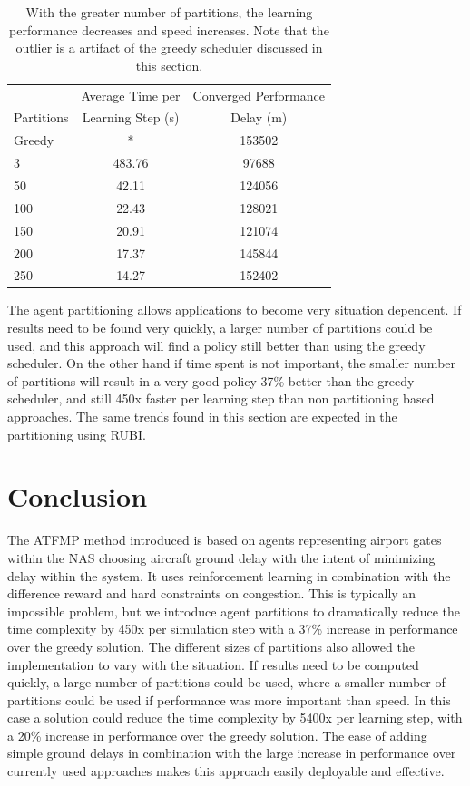 \documentclass{aamas2014}
\begin{document}
\begin{table}
\begin{tabular}{|l|c|c|}
\hline
& Average Time per &Converged Performance\\
Partitions & Learning Step (s) &Delay (m)\\
\hline
Greedy & * & 153502 \\
\hline
3 & 483.76 & 97688 \\
\hline
50 & 42.11 & 124056 \\
\hline
100 & 22.43 & 128021 \\
\hline
150 & 20.91 & 121074 \\
\hline
200 & 17.37 & 145844\\
\hline
250 & 14.27 & 152402 \\
\hline
\end{tabular}
\caption{With the greater number of partitions, the learning performance decreases and speed increases. Note that the outlier is a artifact of the greedy scheduler discussed in this section.}
\label{ATFMPOldTable}
\end{table}

The agent partitioning allows applications to become very situation dependent. If results need to be found very quickly, a larger number of partitions could be used, and this approach will find a policy still better than using the greedy scheduler. On the other hand if time spent is not important, the smaller number of partitions will result in a very good policy 37\% better than the greedy scheduler, and still 450x faster per learning step than non partitioning based approaches. The same trends found in this section are expected in the partitioning using RUBI.


\section{Conclusion}

The ATFMP method introduced is based on agents representing airport gates within the NAS choosing aircraft ground delay with the intent of minimizing delay within the system. It uses reinforcement learning in combination with the difference reward and hard constraints on congestion. This is typically an impossible problem, but we introduce agent partitions to dramatically reduce the time complexity by  450x per simulation step with a 37\% increase in performance over the greedy solution. The different sizes of partitions also allowed the implementation to vary with the situation. If results need to be computed quickly, a large number of partitions could be used, where a smaller number of partitions could be used if performance was more important than speed. In this case a solution could reduce the time complexity by 5400x per learning step, with a 20\% increase in performance over the greedy solution. The ease of adding simple ground delays in combination with the large increase in performance over currently used approaches makes this approach easily deployable and effective.

\label{sec:CONCLUSION}




\end{document}

